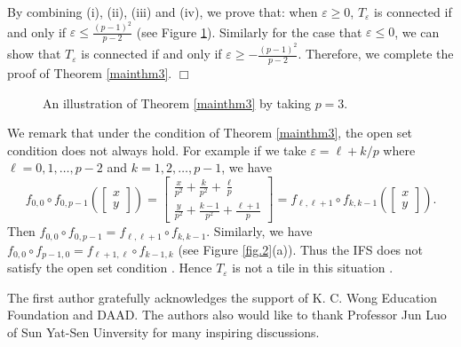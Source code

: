 \documentclass[12pt, reqno]{amsart}
\numberwithin{equation}{section}
\begin{document}
By combining (i), (ii), (iii) and (iv), we prove that: when $\varepsilon\geq 0$, $T_{\varepsilon}$ is connected if and only if $\varepsilon\leq\frac{(p-1)^2}{p-2}$ (see Figure \ref{fig.3}). Similarly for the case that $\varepsilon\leq0$, we can show that $T_{\varepsilon}$ is connected if and only if $\varepsilon\geq -\frac{(p-1)^2}{p-2}$. Therefore, we complete the proof of  Theorem \ref{mainthm3}.
\hfill $\Box$


\begin{figure}[h]
	\centering
	\subfigure[$\varepsilon=3$]{
		\texttt{[image: epsilon=3s.pdf]}
	}\quad
	\subfigure[$\varepsilon=4$]{
		\texttt{[image: epsilon=4s.pdf]}
	}\quad
	\subfigure[$\varepsilon=5$]{
		\texttt{[image: epsilon=5s.pdf]}
	}
      \caption{An illustration of Theorem \ref{mainthm3} by taking $p=3$.}\label{fig.3}
\end{figure}


\bigskip

We remark that under the condition of Theorem \ref{mainthm3}, the open set condition does not always hold. For example  if we take $\varepsilon=\ell+k/p$ where $\ell=0,1,\dots,p-2$ and $k=1,2,\dots,p-1$,  we have
$$f_{0,0}\circ f_{0,p-1}\left(\left[\begin{array}{c}x\\y\end{array}\right]\right)=\left[\begin{array}{c}\frac{x}{p^2}+\frac{k}{p^2}+\frac{\ell}{p}\\
\frac{y}{p^2}+\frac{k-1}{p^2}+\frac{\ell+1}{p}\end{array}\right]=f_{\ell,\ell+1}\circ f_{k,k-1}\left(\left[\begin{array}{c}x\\y\end{array}\right]\right).$$
Then $f_{0,0}\circ f_{0,p-1}=f_{\ell,\ell+1}\circ f_{k,k-1}$. Similarly, we have $f_{0,0}\circ f_{p-1,0}=f_{\ell+1,\ell}\circ f_{k-1,k}$ (see Figure \ref{fig.2}(a)). Thus the IFS does not satisfy the open set condition \cite{BG}. Hence $T_{\varepsilon}$ is not a tile in this situation \cite{LaWa}.






\bigskip
{} The first author gratefully acknowledges the support of K. C. Wong Education Foundation and DAAD. The authors also would like to thank  Professor Jun Luo of Sun Yat-Sen Uinversity for many inspiring discussions.






\bigskip
\end{document}
